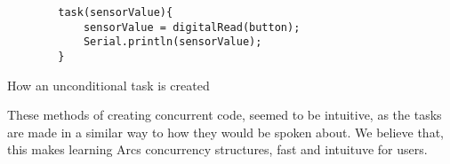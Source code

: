 \begin{listing}[htb!]
    \begin{verbatim}
        task(sensorValue){
            sensorValue = digitalRead(button);
            Serial.println(sensorValue);
        }
    \end{verbatim}
    \caption{How an unconditional task is created}
    \label{List: unconditional task example}
\end{listing}


These methods of creating concurrent code, seemed to be intuitive, as the tasks are made in a similar way to how they would be spoken about. We believe that, this makes learning Arcs concurrency structures, fast and intuituve for users.










